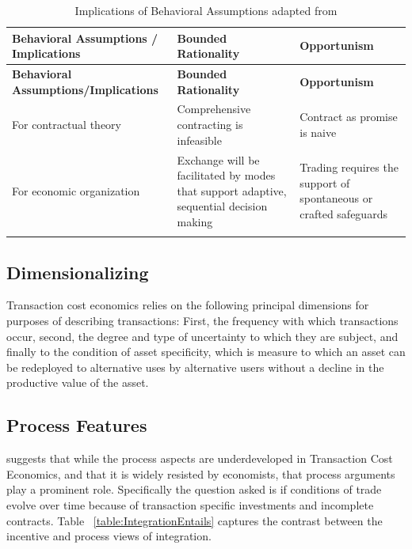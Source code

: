 \documentclass[12pt]{article}
\begin{document}
\begin{center}
\begin{longtable}{|p{}|p{}|p{}|}
\hline \textbf{Behavioral Assumptions /    \null\hfill Implications}&\textbf{Bounded Rationality}&\textbf{Opportunism}\\\hline
\endfirsthead
\hline \textbf{Behavioral Assumptions/Implications}&\textbf{Bounded Rationality}&\textbf{Opportunism}\\\hline
\endhead

For contractual theory&Comprehensive contracting is infeasible&Contract as promise is naive\\\hline
For economic organization&Exchange will be facilitated by modes that support adaptive, sequential decision making&Trading requires the support of spontaneous or crafted safeguards\\\hline

\caption {Implications of Behavioral Assumptions adapted from \cite{Williamson1988}}
\label{table:OrganizationalImplications}\\
\end{longtable}
\end{center}


\subsection{Dimensionalizing}
Transaction cost economics relies on the following principal dimensions for purposes of describing transactions: First,  the frequency with which transactions occur, second, the degree and type of uncertainty to which they are subject, and finally to the condition of asset specificity, which is measure to which an asset can be redeployed to alternative uses by alternative users without a decline in the productive value of the asset.



\subsection{Process Features}
\cite{Williamson1988} suggests that while the process aspects are underdeveloped in Transaction Cost Economics, and that it is widely resisted by economists, that process arguments play a prominent role. Specifically the question asked is if conditions of trade evolve over time because of transaction specific investments and incomplete contracts. Table  ~\ref{table:IntegrationEntails} captures the contrast between the incentive and process views of integration.
\end{document}
